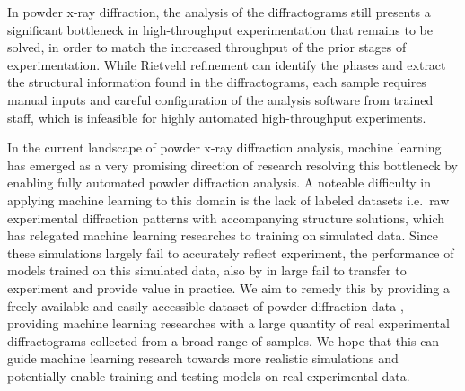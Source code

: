 In powder x-ray diffraction, the analysis of the diffractograms still presents a significant bottleneck
in high-throughput experimentation that remains to be solved, in order to match the increased throughput
of the prior stages of experimentation.
While Rietveld refinement can identify the phases and extract the structural information found
in the diffractograms, each sample requires manual inputs and careful configuration of the analysis software
from trained staff, which is infeasible for highly automated high-throughput experiments.

In the current landscape of powder x-ray diffraction analysis, machine learning has emerged as a very promising direction of research resolving this bottleneck by enabling fully automated powder diffraction analysis.
A noteable difficulty in applying machine learning to this domain is the lack of labeled datasets i.e.\
raw experimental diffraction patterns with accompanying structure solutions, which has relegated machine learning
researches to training on simulated data.
Since these simulations largely fail to accurately reflect experiment, the performance of models trained
on this simulated data, also by in large fail to transfer to experiment and provide value in practice.
We aim to remedy this by providing a freely available and easily accessible dataset of powder diffraction data
, providing machine learning researches with a large quantity of real experimental diffractograms collected
from a broad range of samples.
We hope that this can guide machine learning research towards more realistic
simulations and potentially enable training and testing models on real experimental data.




